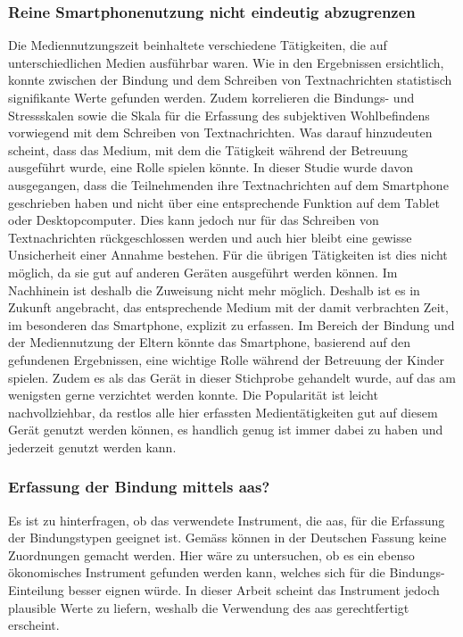 \subsubsection{Reine Smartphonenutzung nicht eindeutig abzugrenzen}
Die Mediennutzungszeit beinhaltete verschiedene Tätigkeiten, die auf unterschiedlichen Medien ausführbar waren. Wie in den Ergebnissen ersichtlich, konnte zwischen der Bindung und dem Schreiben von Textnachrichten statistisch signifikante Werte gefunden werden. Zudem korrelieren die Bindungs- und Stressskalen sowie die Skala für die Erfassung des subjektiven Wohlbefindens vorwiegend mit dem Schreiben von Textnachrichten. Was darauf hinzudeuten scheint, dass das Medium, mit dem die Tätigkeit während der Betreuung ausgeführt wurde, eine Rolle spielen könnte. In dieser Studie wurde davon ausgegangen, dass die Teilnehmenden ihre Textnachrichten auf dem Smartphone geschrieben haben und nicht über eine entsprechende Funktion auf dem Tablet oder Desktopcomputer. Dies kann jedoch nur für das Schreiben von Textnachrichten rückgeschlossen werden und auch hier bleibt eine gewisse Unsicherheit einer Annahme bestehen. Für die übrigen Tätigkeiten ist dies nicht möglich, da sie gut auf anderen Geräten ausgeführt werden können. Im Nachhinein ist deshalb die Zuweisung nicht mehr möglich. Deshalb ist es in Zukunft angebracht, das entsprechende Medium mit der damit verbrachten Zeit, im besonderen das Smartphone, explizit zu erfassen. Im Bereich der Bindung und der Mediennutzung der Eltern könnte das Smartphone, basierend auf den gefundenen Ergebnissen, eine wichtige Rolle während der Betreuung der Kinder spielen. Zudem es als das Gerät in dieser Stichprobe gehandelt wurde, auf das am wenigsten gerne verzichtet werden konnte. Die Popularität ist leicht nachvollziehbar, da restlos alle hier erfassten Medientätigkeiten gut auf diesem Gerät genutzt werden können, es handlich genug ist immer dabei zu haben und jederzeit genutzt werden kann. 

\subsubsection{Erfassung der Bindung mittels \acrshort{aas}?}
Es ist zu hinterfragen, ob das verwendete Instrument, die \acrfull{aas}, für die Erfassung der Bindungstypen geeignet ist. Gemäss  können in der Deutschen Fassung keine Zuordnungen gemacht werden. Hier wäre zu untersuchen, ob es ein ebenso ökonomisches Instrument gefunden werden kann, welches sich für die Bindungs-Einteilung besser eignen würde. In dieser Arbeit scheint das Instrument jedoch plausible Werte zu liefern, weshalb die Verwendung des \acrshort{aas} gerechtfertigt erscheint. 

